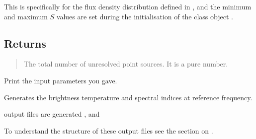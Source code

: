 \documentclass[letterpaper,10pt,english]{sphinxmanual}
\begin{document}
\begin{fulllineitems}
\begin{fulllineitems}
\sphinxAtStartPar
This is specifically for the flux density distribution defined in {\hyperref[\detokenize{api:furs.furs.dndS}]{}},
and the minimum and maximum \(S\) values are set during the initialisation of the class object {\hyperref[\detokenize{api:module-furs}]{}}.


\subsection{Returns}
\label{\detokenize{api:id8}}\begin{quote}

\sphinxAtStartPar
The total number of unresolved point sources. It is a pure number.
\end{quote}

\end{fulllineitems}


\begin{fulllineitems}
\label{\detokenize{api:furs.furs.print_input}}
\pysigstartsignatures
{}
\pysigstopsignatures
\sphinxAtStartPar
Print the input parameters you gave.

\end{fulllineitems}


\begin{fulllineitems}
\label{\detokenize{api:furs.furs.ref_freq}}
\pysigstartsignatures
{}
\pysigstopsignatures
\sphinxAtStartPar
Generates the brightness temperature and spectral indices at reference frequency.

 output files are generated ,  and 

\sphinxAtStartPar
To understand the structure of these output files see the section on {\hyperref[\detokenize{detexp:ref-freq}]{}}.

\end{fulllineitems}


\end{fulllineitems}
\end{document}
